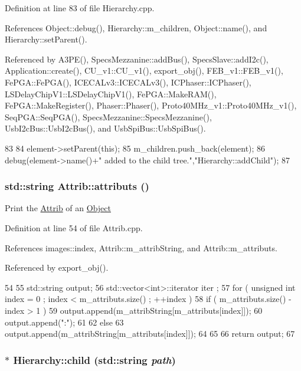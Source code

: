 Definition at line 83 of file Hierarchy.cpp.

References Object::debug(), Hierarchy::m\_\-children, Object::name(), and Hierarchy::setParent().

Referenced by A3PE(), SpecsMezzanine::addBus(), SpecsSlave::addI2c(), Application::create(), CU\_\-v1::CU\_\-v1(), export\_\-obj(), FEB\_\-v1::FEB\_\-v1(), FePGA::FePGA(), ICECALv3::ICECALv3(), ICPhaser::ICPhaser(), LSDelayChipV1::LSDelayChipV1(), FePGA::MakeRAM(), FePGA::MakeRegister(), Phaser::Phaser(), Proto40MHz\_\-v1::Proto40MHz\_\-v1(), SeqPGA::SeqPGA(), SpecsMezzanine::SpecsMezzanine(), UsbI2cBus::UsbI2cBus(), and UsbSpiBus::UsbSpiBus().


\begin{DoxyCode}
83                                           {
84   element->setParent(this);
85   m_children.push_back(element);
86   debug(element->name()+" added to the child tree.","Hierarchy::addChild");
87 }
\end{DoxyCode}
\hypertarget{classAttrib_aee7bbf16b144887f196e1341b24f8a26}{
\subsubsection[{attributs}]{\setlength{\rightskip}{0pt plus 5cm}std::string Attrib::attributs ()}}
\label{classAttrib_aee7bbf16b144887f196e1341b24f8a26}
Print the \hyperlink{classAttrib}{Attrib} of an \hyperlink{classObject}{Object} 

Definition at line 54 of file Attrib.cpp.

References images::index, Attrib::m\_\-attribString, and Attrib::m\_\-attributs.

Referenced by export\_\-obj().


\begin{DoxyCode}
54                             {
55   std::string output;
56   std::vector<int>::iterator iter ;
57   for ( unsigned int index = 0 ; index < m_attributs.size() ; ++index ) {
58     if ( m_attributs.size() - index > 1 ) {
59       output.append(m_attribString[m_attributs[index]]);
60       output.append(":");
61     }
62     else {
63       output.append(m_attribString[m_attributs[index]]);
64     }
65   }
66   return output;
67 }
\end{DoxyCode}
\hypertarget{classHierarchy_a1e207f973c694b538bf90107b4868817}{
\subsubsection[{child}]{ $\ast$ Hierarchy::child (std::string {\em path})}}
\label{classHierarchy_a1e207f973c694b538bf90107b4868817}


